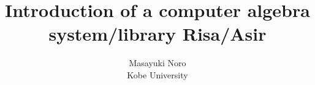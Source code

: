 \newtheorem{df}{Definition}
\newtheorem{pr}[df]{Proposition}
\newtheorem{lm}[df]{Lemma}
\newtheorem{th}[df]{Theorem}
\newtheorem{co}[df]{Corollary}
\newtheorem{al}[df]{Algorithm}
\newtheorem{re}[df]{Remark}
\newtheorem{ex}[df]{Example}
\newtheorem{mt}[df]{Method}
\newtheorem{nt}[df]{Notation}
\newtheorem{as}[df]{Assumption}
\newtheorem{pro}[df]{Procedure}
\newtheorem{prob}[df]{Probrem}
\newcommand{\qed}{$\Box$}
\newcommand{\mred}[1]{\smash{\mathop{\hbox{\rightarrowfill}}\limits_{\scriptstyle #1}}}
\newcommand{\tmred}[1]{\smash{\mathop{\hbox{\rightarrowfill}}\limits_{\scriptstyle #1}\limits^{\scriptstyle *}}}
\def\gr{Gr\"obner basis }
\def\st{\, s.t. \,}
\def\ni{\noindent} 
\def\ve{\vfill\eject} 
\textwidth 9.2in
\textheight 7.2in
\columnsep 0.33in
\topmargin -1in

\title{Introduction of a computer algebra system/library Risa/Asir}

\author{Masayuki Noro\\ Kobe University}

\setlength{\parskip}{10pt}
\maketitle
{}


